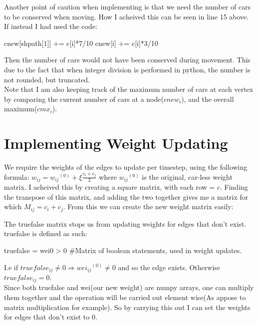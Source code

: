 \documentclass[paper=a4, fontsize=12pt]{scrartcl} %
\numberwithin{equation}{section}       %
\numberwithin{figure}{section}         %
\numberwithin{table}{section}          %
\begin{document}
Another point of caution when implementing is that we need the number of cars to be conserved when moving. How I acheived this can be seen in line 15 above. If instead I had used the code: 
\begin{python}
cnew[shpath[1]] += c[i]*7/10
cnew[i] += c[i]*3/10
\end{python}
Then the number of cars would not have been conserved during movement. This due to the fact that when integer division is performed in python, the number is not rounded, but truncated. \\
Note that I am also keeping track of the maximum number of cars at each vertex by comparing the current number of cars at a node($cnew_i$), and the overall maximum($cmx_i$).

\section{Implementing Weight Updating}
We require the weights of the edges to update per timestep, using the following formula:
$w_{ij} = {w_{ij}}^{(0)} + \xi \frac{{c_i}+{c_j}}{2} $
where ${w_{ij}}^{(0)}$ is the original, car-less weight matrix. 
I acheived this by creating a square matrix, with each row = $c$. Finding the transpose of this matrix, and adding the two together gives me a matrix for which $M_{ij}=c_i+c_j$.
From this we can create the new weight matrix easily:
The truefalse matrix stops us from updating weights for edges that don't exist. truefalse is defined as such:
\begin{python}
truefalse = wei0 > 0 
#Matrix of boolean statements, used in weight updates.
\end{python}
I.e if $truefalse_{ij} \neq 0 \Rightarrow {wei_{ij}}^{(0)} \neq 0$ and so the edge exists. Otherwise $truefalse_{ij} =0$.\\ Since both truefalse and wei(our new weight) are numpy arrays, one can multiply them together and the operation will be carried out element wise(As appose to matrix multiplication for example). So by carrying this out I can set the weights for edges that don't exist to 0.
\end{document}
